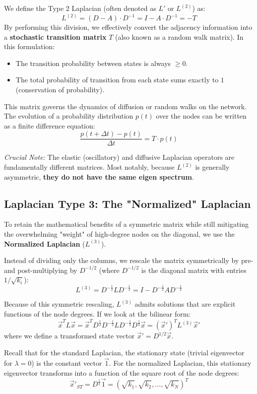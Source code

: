 We define the Type 2 Laplacian (often denoted as \( L' \) or \( L^{(2)} \)) as:
\[
    L^{(2)} = (D - A) \cdot D^{-1} = I - A \cdot D^{-1} = -T
\]
By performing this division, we effectively convert the adjacency information into a \textbf{stochastic transition matrix} \( T \) (also known as a random walk matrix). In this formulation:
\begin{itemize}
    \item The transition probability between states is always \( \geq 0 \).
    \item The total probability of transition from each state sums exactly to \( 1 \) (conservation of probability).
\end{itemize}

This matrix governs the dynamics of diffusion or random walks on the network. The evolution of a probability distribution \( p(t) \) over the nodes can be written as a finite difference equation:
\[
    \frac{p(t + \Delta t) - p(t)}{\Delta t} = T \cdot p(t)
\]

\textit{Crucial Note:} The elastic (oscillatory) and diffusive Laplacian operators are fundamentally different matrices. Most notably, because \( L^{(2)} \) is generally asymmetric, \textbf{they do not have the same eigen spectrum}.

\subsection{Laplacian Type 3: The "Normalized" Laplacian}
To retain the mathematical benefits of a symmetric matrix while still mitigating the overwhelming "weight" of high-degree nodes on the diagonal, we use the \textbf{Normalized Laplacian} (\( L^{(3)} \)).

Instead of dividing only the columns, we rescale the matrix symmetrically by pre- and post-multiplying by \( D^{-1/2} \) (where \( D^{-1/2} \) is the diagonal matrix with entries \( 1/\sqrt{k_i} \)):
\[
    L^{(3)} = D^{-\frac{1}{2}} L D^{-\frac{1}{2}} = I - D^{-\frac{1}{2}} A D^{-\frac{1}{2}}
\]

Because of this symmetric rescaling, \( L^{(3)} \) admits solutions that are explicit functions of the node degrees. If we look at the bilinear form:
\[
    \vec{x}^T L \vec{x} = \vec{x}^T D^{\frac{1}{2}} D^{-\frac{1}{2}} L D^{-\frac{1}{2}} D^{\frac{1}{2}} \vec{x} = (\vec{x}')^T L^{(3)} \vec{x}'
\]
where we define a transformed state vector \( \vec{x}' = D^{1/2} \vec{x} \).

Recall that for the standard Laplacian, the stationary state (trivial eigenvector for \( \lambda = 0 \)) is the constant vector \( \vec{1} \). For the normalized Laplacian, this stationary eigenvector transforms into a function of the square root of the node degrees:
\[
    \vec{x}'_{ST} = D^{\frac{1}{2}} \vec{1} = \left( \sqrt{k_1}, \sqrt{k_2}, \dots, \sqrt{k_N} \right)^T
\]

